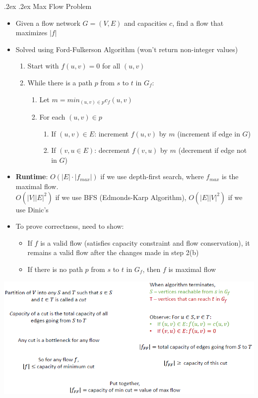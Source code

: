 \documentclass[10pt,landscape,a4paper]{article}
\makeatletter
\renewcommand{\subsection}{\@startsection{subsection}{1}{0mm}%
    {.2ex}%
    {.2ex}%
    {\sffamily\bfseries}}
\makeatother
\begin{document}
\begin{multicols*}{4}
	\subsection{Max Flow Problem}
	\begin{itemize}
		\item Given a flow network $G=(V,E)$ and capacities $c$, find a flow that maximizes $|f|$
		\item Solved using Ford-Fulkerson Algorithm (won't return non-integer values)
		      \begin{enumerate}
			      \item Start with $f(u,v)=0$ for all $(u,v)$
			      \item While there is a path $p$ from $s$ to $t$ in $G_f$:
			            \begin{enumerate}
				            \item Let $m=min_{(u,v)\in p}c_f(u,v)$
				            \item For each $(u,v)\in p$
				                  \begin{enumerate}
					                  \item If $(u,v)\in E$: increment  $f(u,v)$ by $m$ (increment if edge in $G$)
					                  \item If $(v,u\in E)$: decrement $f(v,u)$ by $m$ (decrement if edge not in $G$)
				                  \end{enumerate}
			            \end{enumerate}
		      \end{enumerate}
		\item \textbf{Runtime}: $O(|E|\cdot |f_{max}|)$ if we use depth-first search, where $f_{max}$ is the maximal flow.\\
		      $O(|V||E|^2)$ if we use BFS (Edmonds-Karp Algorithm), $O(|E||V|^2)$ if we use Dinic's
		\item To prove correctness, need to show:
		      \begin{itemize}
			      \item If $f$ is a valid flow (satisfies capacity constraint and flow conservation), it remains a valid flow after the changes made in step 2(b)
			      \item If there is no path $p$ from $s$ to $t$ in $G_f$, then $f$ is maximal flow
		      \end{itemize}
	\end{itemize}
	\begin{center}
		\includegraphics[width=0.6\columnwidth]{flows-and-cuts}
	\end{center}

\end{multicols*}
\end{document}

